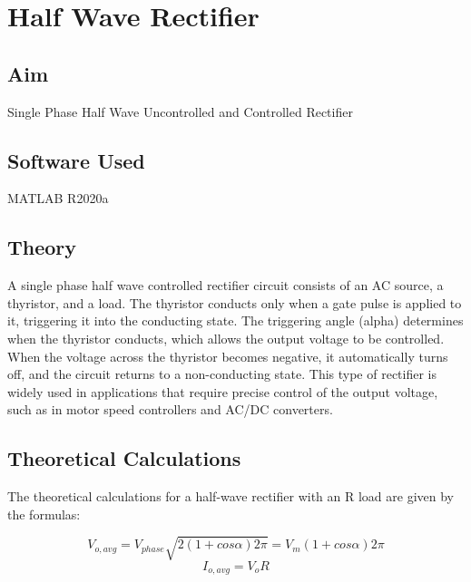 \chapter{Half Wave Rectifier}
\vspace{-1cm}

\section{Aim}
\hspace{1cm}Single Phase Half Wave Uncontrolled and Controlled Rectifier

\section{Software Used}
\hspace{1cm}MATLAB R2020a
\section{Theory}
\hspace{\parindent}

A single phase half wave controlled rectifier circuit consists of an AC source, a thyristor, and a load. The thyristor conducts only when a gate pulse is applied to it, triggering it into the conducting state. The triggering angle (alpha) determines when the thyristor conducts, which allows the output voltage to be controlled. When the voltage across the thyristor becomes negative, it automatically turns off, and the circuit returns to a non-conducting state. This type of rectifier is widely used in applications that require precise control of the output voltage, such as in motor speed controllers and AC/DC converters.



\section{Theoretical Calculations}
\hspace{\parindent}
The theoretical calculations for a half-wave rectifier with an R load are given by the formulas:


$$
    V_{o,avg} =
    V_{phase}
    \sqrt{2(1 + cos\alpha)2\pi} =
    V_m(1 + cos\alpha)
    2\pi
$$
$$
    I_{o,avg} =
    V_oR
$$

